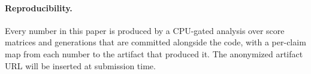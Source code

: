 \documentclass{article}
\begin{document}
\paragraph{Reproducibility.} Every number in this paper is produced by a CPU-gated analysis over
score matrices and generations that are committed alongside the code, with a per-claim map from
each number to the artifact that produced it. The anonymized artifact URL will be inserted at
submission time.

% 
\end{document}
